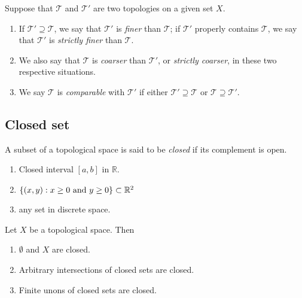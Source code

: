 \begin{definition}
  Suppose that \( \mathcal{T} \) and \( \mathcal{T}' \)  are two topologies on a
  given set \( X \).
  \begin{enumerate}
    \item If \( \mathcal{T}' \supseteq \mathcal{T} \), we say that \(
      \mathcal{T}' \) is \emph{finer} than \( \mathcal{T} \); if \( \mathcal{T}'
      \) properly contains \( \mathcal{T} \), we say that \( \mathcal{T}' \) is
      \emph{strictly finer} than \( \mathcal{T} \).
    \item We also say that \( \mathcal{T} \) is \emph{coarser} than \(
      \mathcal{T}' \), or \emph{strictly coarser}, in these two respective
      situations.
    \item We say \( \mathcal{T} \) is \emph{comparable} with \( \mathcal{T}' \)
      if either \( \mathcal{T}' \supseteq \mathcal{T} \) or \( \mathcal{T}
      \supseteq \mathcal{T}' \).
  \end{enumerate}
\end{definition}

\subsection{Closed set}

\begin{definition}
  A subset of a topological space is said to be \emph{closed} if its complement
  is open.
\end{definition}

\begin{example}
  \begin{enumerate}
    \item Closed interval \( [a, b] \) in \( \mathbb{R} \).
    \item \( \{ (x, y): x \geq 0 \textmd{ and } y \geq 0 \} \subset \mathbb{R}^2 \)
    \item any set in discrete space.
  \end{enumerate}
\end{example}

\begin{theorem}
  Let \( X \) be a topological space. Then
  \begin{enumerate}
    \item \( \emptyset \) and \( X \) are closed.
    \item Arbitrary intersections of closed sets are closed.
    \item Finite unons of closed sets are closed.
  \end{enumerate}
\end{theorem}

